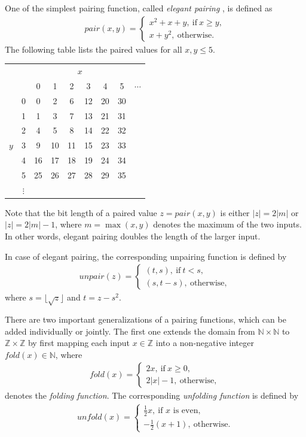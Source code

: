 \documentclass[bibtotoc,halfparskip,oneside]{scrreprt}
\begin{document}
One of the simplest pairing function, called \emph{elegant pairing} \cite{szudzik06}, is defined as 
\begin{align}
	\mathit{pair}(x,y) = \begin{cases}x^2+x +y,~\text{if}~x\geq y, \\ x+y^2,~\text{otherwise}. \end{cases}
\end{align}
The following table lists the paired values for all $x,y\leq 5$.
\begin{center}
\begin{tabular}{cc|ccccccc}
\multicolumn{2}{c}{}& \multicolumn{6}{c}{$x$} \\
    &   & 0 & 1 & 2 & 3 & 4 & 5 & $\cdots$ \\\cline{2-9}
    & 0 & 0 & 2 & 6 & 12& 20& 30& \\
    & 1 & 1 & 3 & 7 & 13& 21& 31& \\
    & 2 & 4 & 5 & 8 & 14& 22& 32& \\
$y$ & 3 & 9 & 10& 11& 15& 23& 33& \\
    & 4 & 16& 17& 18& 19& 24& 34& \\
    & 5 & 25& 26& 27& 28& 29& 35& \\
    & $\vdots$ & & & & & & & \\
\end{tabular} 
\end{center}
Note that the bit length of a paired value $z=\mathit{pair}(x,y)$ is either $|z| =2|m|$ or $|z|=2|m|-1$, where $m=\max(x,y)$ denotes the maximum of the two inputs. In other words, elegant pairing doubles the length of the larger input.

In case of elegant pairing, the corresponding unpairing function is defined by
\begin{align}
	\mathit{unpair}(z)=\begin{cases}(t,s),~\text{if}~t<s,\\(s,t-s),~\text{otherwise},\end{cases}
\end{align}
where $s=\lfloor\sqrt{z}\rfloor$ and $t=z-s^2$.

There are two important generalizations of a pairing functions, which can be added individually or jointly. The first one extends the domain from $\mathbb{N}\times\mathbb{N}$ to $\mathbb{Z}\times\mathbb{Z}$ by first mapping each input $x\in\mathbb{Z}$ into a non-negative integer $\mathit{fold}(x)\in\mathbb{N}$, where
\begin{align}
	\mathit{fold}(x)=\begin{cases}2x,~\text{if}~x\geq 0,\\2|x|-1,~\text{otherwise},\end{cases}
\end{align}
denotes the \emph{folding function}. The corresponding \emph{unfolding function} is defined by
\begin{align}
	\mathit{unfold}(x)=\begin{cases}\frac{1}{2}x,~\text{if $x$ is even},\\
	-\frac{1}{2}(x+1),~\text{otherwise}.\end{cases}
\end{align}
\end{document}
